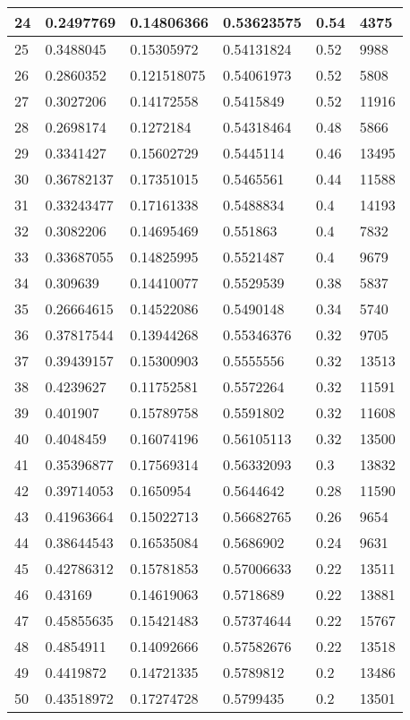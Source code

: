 \begin{longtable}{|l|l|l|l|l|l|}
24 & 0.2497769 & 0.14806366 & 0.53623575 & 0.54 & 4375 \\ \hline 
25 & 0.3488045 & 0.15305972 & 0.54131824 & 0.52 & 9988 \\ \hline 
26 & 0.2860352 & 0.121518075 & 0.54061973 & 0.52 & 5808 \\ \hline 
27 & 0.3027206 & 0.14172558 & 0.5415849 & 0.52 & 11916 \\ \hline 
28 & 0.2698174 & 0.1272184 & 0.54318464 & 0.48 & 5866 \\ \hline 
29 & 0.3341427 & 0.15602729 & 0.5445114 & 0.46 & 13495 \\ \hline 
30 & 0.36782137 & 0.17351015 & 0.5465561 & 0.44 & 11588 \\ \hline 
31 & 0.33243477 & 0.17161338 & 0.5488834 & 0.4 & 14193 \\ \hline 
32 & 0.3082206 & 0.14695469 & 0.551863 & 0.4 & 7832 \\ \hline 
33 & 0.33687055 & 0.14825995 & 0.5521487 & 0.4 & 9679 \\ \hline 
34 & 0.309639 & 0.14410077 & 0.5529539 & 0.38 & 5837 \\ \hline 
35 & 0.26664615 & 0.14522086 & 0.5490148 & 0.34 & 5740 \\ \hline 
36 & 0.37817544 & 0.13944268 & 0.55346376 & 0.32 & 9705 \\ \hline 
37 & 0.39439157 & 0.15300903 & 0.5555556 & 0.32 & 13513 \\ \hline 
38 & 0.4239627 & 0.11752581 & 0.5572264 & 0.32 & 11591 \\ \hline 
39 & 0.401907 & 0.15789758 & 0.5591802 & 0.32 & 11608 \\ \hline 
40 & 0.4048459 & 0.16074196 & 0.56105113 & 0.32 & 13500 \\ \hline 
41 & 0.35396877 & 0.17569314 & 0.56332093 & 0.3 & 13832 \\ \hline 
42 & 0.39714053 & 0.1650954 & 0.5644642 & 0.28 & 11590 \\ \hline 
43 & 0.41963664 & 0.15022713 & 0.56682765 & 0.26 & 9654 \\ \hline 
44 & 0.38644543 & 0.16535084 & 0.5686902 & 0.24 & 9631 \\ \hline 
45 & 0.42786312 & 0.15781853 & 0.57006633 & 0.22 & 13511 \\ \hline 
46 & 0.43169 & 0.14619063 & 0.5718689 & 0.22 & 13881 \\ \hline 
47 & 0.45855635 & 0.15421483 & 0.57374644 & 0.22 & 15767 \\ \hline 
48 & 0.4854911 & 0.14092666 & 0.57582676 & 0.22 & 13518 \\ \hline 
49 & 0.4419872 & 0.14721335 & 0.5789812 & 0.2 & 13486 \\ \hline 
50 & 0.43518972 & 0.17274728 & 0.5799435 & 0.2 & 13501 \\ \hline 
\end{longtable}